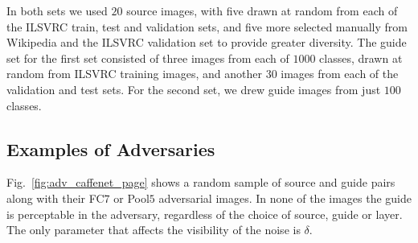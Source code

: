 \documentclass{article} %
\begin{document}
In both sets we used $20$ source images, with five drawn at random from each of
the ILSVRC train, test and validation sets, and five more selected manually
from Wikipedia and the ILSVRC validation set to provide greater diversity.  The
guide set for the first set consisted of three images from each of $1000$
classes, drawn at random from ILSVRC training images, and another $30$ images
from each of the validation and test sets. For the second set, we drew guide
images from just $100$ classes.

\subsection{Examples of Adversaries}
Fig.~\ref{fig:adv_caffenet_page} shows a random sample of source and guide
pairs along with their FC$7$ or Pool$5$ adversarial images. In none of the images the guide is perceptable in the adversary, regardless of the
choice of source, guide or layer. The only parameter that affects the
visibility of the noise is $\delta$.
\end{document}
